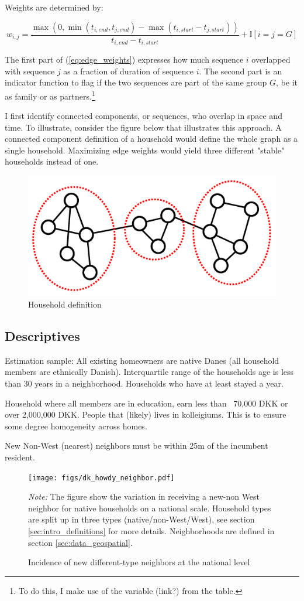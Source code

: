 \documentclass[main.tex]{subfiles}
\begin{document}
Weights are determined by:

\begin{equation}
    w_{i, j} = \frac{\max(0 , \min(t_{i,end}, t_{j, end}) -\max(t_{i,start}-t_{j, start}))}{t_{i,end}-t_{i,start}} + \mathbb{I}[i=j=G]
    \label{eq:edge_weights}
\end{equation}

The first part of (\ref{eq:edge_weights}) expresses how much sequence $i$ overlapped with sequence $j$ as a fraction of duration of sequence $i$. The second part is an indicator function to flag if the two sequences are part of the same group $G$, be it as family or as partners.\footnote{To do this, I make use of the  variable (link?) from the  table.}

I first identify connected components, or sequences, who overlap in space and time. To illustrate, consider the figure below that illustrates this approach. A connected component definition of a household would define the whole graph as a single household. Maximizing edge weights would yield three different "stable" households instead of one.
\begin{figure}[H]
    \centering
    \caption{Household definition}
    \includegraphics[width=0.4\linewidth]{figs/temporal_community_detection.png}
\end{figure}


\subsection{Descriptives}
Estimation sample: 
All existing homeowners are native Danes (all household members are ethnically Danish). Interquartile range of the households age is less than 30 years in a neighborhood. Households who have at least stayed a year. 

Household where all members are in education, earn less than ~70,000 DKK or over 2,000,000 DKK. People that (likely) lives in kolleigiums. This is to ensure some degree homogeneity across homes. 

New Non-West (nearest) neighbors must be within 25m of the incumbent resident. 
\begin{figure}
    \centering
    \caption{Incidence of new different-type neighbors at the national level}
    \texttt{[image: figs/dk\_howdy\_neighbor.pdf]}
    \label{fig:incidence_different_type_dk}
\begin{tablenotes}
\item \footnotesize \textit{Note:} The figure show the variation in receiving a new-non West neighbor for native households on a national scale. Household types are split up in three types (native/non-West/West), see section \ref{sec:intro_definitions} for more details. Neighborhoods are defined in section \ref{sec:data_geospatial}.
\end{tablenotes}
\end{figure}
\end{document}
